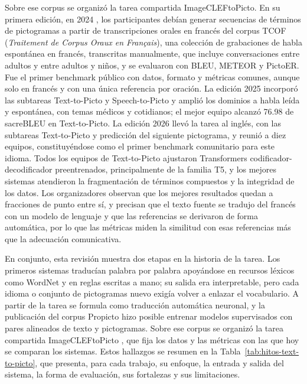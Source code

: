 Sobre ese corpus se organizó la tarea compartida ImageCLEFtoPicto. En su primera edición, en 2024 \cite{ionescu2024}, los participantes debían generar secuencias de términos de pictogramas a partir de transcripciones orales en francés del corpus TCOF (\textit{Traitement de Corpus Oraux en Français}), una colección de grabaciones de habla espontánea en francés, transcritas manualmente, que incluye conversaciones entre adultos y entre adultos y niños, y se evaluaron con BLEU, METEOR y PictoER. Fue el primer benchmark público con datos, formato y métricas comunes, aunque solo en francés y con una única referencia por oración. La edición 2025 \cite{macaire2025overview} incorporó las subtareas Text-to-Picto y Speech-to-Picto y amplió los dominios a habla leída y espontánea, con temas médicos y cotidianos; el mejor equipo alcanzó 76.98 de sacreBLEU en Text-to-Picto. La edición 2026 \cite{Hjuler2026} llevó la tarea al inglés, con las subtareas Text-to-Picto y predicción del siguiente pictograma, y reunió a diez equipos, constituyéndose como el primer benchmark comunitario para este idioma. Todos los equipos de Text-to-Picto ajustaron Transformers codificador-decodificador preentrenados, principalmente de la familia T5, y los mejores sistemas atendieron la fragmentación de términos compuestos y la integridad de los datos. Los organizadores observan que los mejores resultados quedan a fracciones de punto entre sí, y precisan que el texto fuente se tradujo del francés con un modelo de lenguaje y que las referencias se derivaron de forma automática, por lo que las métricas miden la similitud con esas referencias más que la adecuación comunicativa.

En conjunto, esta revisión muestra dos etapas en la historia de la tarea. Los primeros sistemas \cite{vandeghinste2017, sevens2015, bautista2017, norre2021} traducían palabra por palabra apoyándose en recursos léxicos como WordNet y en reglas escritas a mano; su salida era interpretable, pero cada idioma o conjunto de pictogramas nuevo exigía volver a enlazar el vocabulario. A partir de \cite{mutal2022} la tarea se formula como traducción automática neuronal, y la publicación del corpus Propicto \cite{macaire2024} hizo posible entrenar modelos supervisados con pares alineados de texto y pictogramas. Sobre ese corpus se organizó la tarea compartida ImageCLEFtoPicto \cite{ionescu2024, macaire2025overview, Hjuler2026}, que fija los datos y las métricas con las que hoy se comparan los sistemas. Estos hallazgos se resumen en la Tabla~\ref{tab:hitos-text-to-picto}, que presenta, para cada trabajo, su enfoque, la entrada y salida del sistema, la forma de evaluación, sus fortalezas y sus limitaciones.

